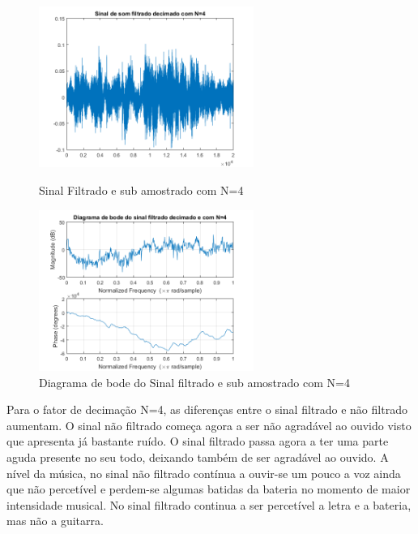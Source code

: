 \documentclass[11pt]{article}
\begin{document}
\newpage
\begin{figure}[h]
\begin{center}
\begin{minipage}[b]{0.45\linewidth}
\includegraphics[width=7cm]{fds4.png}
\caption{Sinal Filtrado e sub amostrado com N=4}
\label{figura11}
\end{minipage}
\begin{minipage}[b]{0.45\linewidth}
\includegraphics[width=7cm]{fdb4.png}
\caption{Diagrama de bode do Sinal filtrado e sub amostrado com N=4}
\label{figura}
\end{minipage}
\end{center}
\end{figure}
Para o fator de decimação N=4, as diferenças entre o sinal filtrado e não filtrado aumentam. O sinal não filtrado começa agora a ser não agradável ao ouvido visto que apresenta já bastante ruído. O sinal filtrado passa agora a ter uma parte aguda presente no seu todo, deixando também de ser agradável ao ouvido. A nível da música, no sinal não filtrado contínua a ouvir-se um pouco a voz ainda que não percetível e perdem-se algumas batidas da bateria no momento de maior intensidade musical. No  sinal filtrado continua a ser percetível a letra e a bateria, mas não a guitarra.

\newpage
\end{document}
